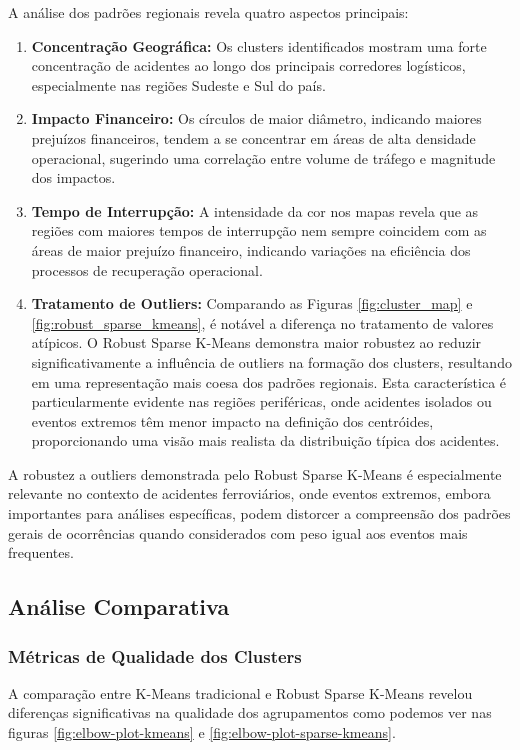 \documentclass[conference]{IEEEtran}
\begin{document}
A análise dos padrões regionais revela quatro aspectos principais:

\begin{enumerate}
    \item \textbf{Concentração Geográfica:} Os clusters identificados mostram uma forte concentração de acidentes ao longo dos principais corredores logísticos, especialmente nas regiões Sudeste e Sul do país.
    
    \item \textbf{Impacto Financeiro:} Os círculos de maior diâmetro, indicando maiores prejuízos financeiros, tendem a se concentrar em áreas de alta densidade operacional, sugerindo uma correlação entre volume de tráfego e magnitude dos impactos.
    
    \item \textbf{Tempo de Interrupção:} A intensidade da cor nos mapas revela que as regiões com maiores tempos de interrupção nem sempre coincidem com as áreas de maior prejuízo financeiro, indicando variações na eficiência dos processos de recuperação operacional.
    
    \item \textbf{Tratamento de Outliers:} Comparando as Figuras \ref{fig:cluster_map} e \ref{fig:robust_sparse_kmeans}, é notável a diferença no tratamento de valores atípicos. O Robust Sparse K-Means demonstra maior robustez ao reduzir significativamente a influência de outliers na formação dos clusters, resultando em uma representação mais coesa dos padrões regionais. Esta característica é particularmente evidente nas regiões periféricas, onde acidentes isolados ou eventos extremos têm menor impacto na definição dos centróides, proporcionando uma visão mais realista da distribuição típica dos acidentes.
\end{enumerate}

A robustez a outliers demonstrada pelo Robust Sparse K-Means é especialmente relevante no contexto de acidentes ferroviários, onde eventos extremos, embora importantes para análises específicas, podem distorcer a compreensão dos padrões gerais de ocorrências quando considerados com peso igual aos eventos mais frequentes.

\subsection{Análise Comparativa}

\subsubsection{Métricas de Qualidade dos Clusters}
A comparação entre K-Means tradicional e Robust Sparse K-Means revelou diferenças significativas na qualidade dos agrupamentos como podemos ver nas figuras \ref{fig:elbow-plot-kmeans} e \ref{fig:elbow-plot-sparse-kmeans}.
\end{document}

